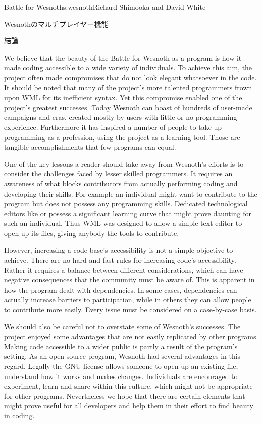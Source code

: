 \begin{aosachapter}{Battle for Wesnoth}{s:wesnoth}{Richard Shimooka and David White}
\begin{aosasect1}{Wesnothのマルチプレイヤー機能}
\end{aosasect1}

\begin{aosasect1}{結論}

We believe that the beauty of the Battle for Wesnoth as a program is
how it made coding accessible to a wide variety of individuals. To
achieve this aim, the project often made compromises that do not look
elegant whatsoever in the code. It should be noted that many of the
project's more talented programmers frown upon WML for its inefficient
syntax. Yet this compromise enabled one of the project's greatest
successes. Today Wesnoth can boast of hundreds of user-made campaigns
and eras, created mostly by users with little or no programming
experience. Furthermore it has inspired a number of people to take up
programming as a profession, using the project as a learning
tool. Those are tangible accomplishments that few programs can equal.

One of the key lessons a reader should take away from Wesnoth's
efforts is to consider the challenges faced by lesser skilled
programmers. It requires an awareness of what blocks contributors from
actually performing coding and developing their skills. For example an
individual might want to contribute to the program but does not
possess any programming skills. Dedicated technological editors like
 or  possess a significant learning curve that
might prove daunting for such an individual. Thus WML was designed to
allow a simple text editor to open up its files, giving anybody the
tools to contribute.

However, increasing a code base's accessibility is not a simple
objective to achieve. There are no hard and fast rules for increasing
code's accessibility. Rather it requires a balance between different
considerations, which can have negative consequences that the
community must be aware of. This is apparent in how the program dealt
with dependencies. In some cases, dependencies can actually increase
barriers to participation, while in others they can allow people to
contribute more easily. Every issue must be considered on a
case-by-case basis.

We should also be careful not to overstate some of Wesnoth's
successes.  The project enjoyed some advantages that are not easily
replicated by other programs. Making code accessible to a wider public
is partly a result of the program's setting. As an open source
program, Wesnoth had several advantages in this regard. Legally the
GNU license allows someone to open up an existing file, understand how
it works and makes changes.  Individuals are encouraged to experiment,
learn and share within this culture, which might not be appropriate
for other programs. Nevertheless we hope that there are certain
elements that might prove useful for all developers and help them in
their effort to find beauty in coding.

\end{aosasect1}

\end{aosachapter}
